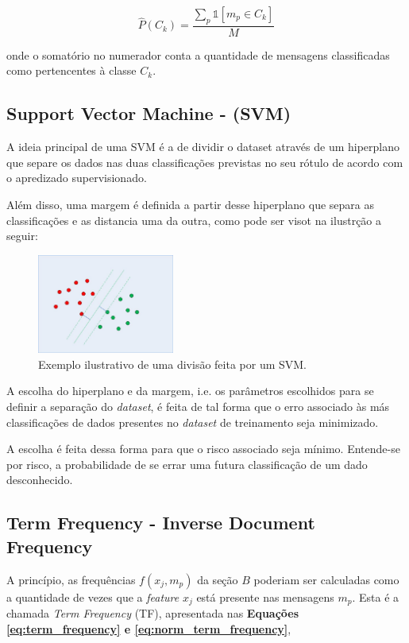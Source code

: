 \documentclass[conference]{IEEEtran}
\begin{document}
\begin{equation} \label{eq:class_prob}
\hat{P}(C_k) = \frac{\sum\limits_p \mathds{1}\left[m_p \in C_k\right]}{M}
\end{equation}

\noindent onde o somatório no numerador conta a quantidade de mensagens classificadas como pertencentes à classe $C_k$. 

\subsection{Support Vector Machine - (SVM)} 

A ideia principal de uma SVM \cite{svm} é a de dividir o dataset através de um hiperplano que separe os dados nas duas classificações previstas no seu rótulo de acordo com o apredizado supervisionado.

Além disso, uma margem é definida a partir desse hiperplano que separa as classificações e as distancia uma da outra, como pode ser visot na ilustrção a seguir:

\begin{figure}[htbp]
	\includegraphics[width=0.4\textwidth,center]{imgs/svm.jpg}
	\caption{Exemplo ilustrativo de uma divisão feita por um SVM.}
	\label{fig:svm_exemple}
\end{figure}

A escolha do hiperplano e da margem, i.e. os parâmetros escolhidos para se definir a separação do \textit{dataset}, é feita de tal forma que o erro associado às más classificações de dados presentes no \textit{dataset} de treinamento seja minimizado.

A escolha é feita dessa forma para que o risco associado seja mínimo. Entende-se por risco, a probabilidade de se errar uma futura classificação de um dado desconhecido.

\subsection{Term Frequency - Inverse Document Frequency}

A princípio, as frequências $f\left(x_j, m_p\right)$ da seção $B$ poderiam ser calculadas como a quantidade de vezes que a \textit{feature} $x_j$ está presente nas mensagens $m_p$. Esta é a chamada \textit{Term Frequency} (TF), apresentada nas \textbf{Equações \eqref{eq:term_frequency} e \eqref{eq:norm_term_frequency}},
\end{document}
